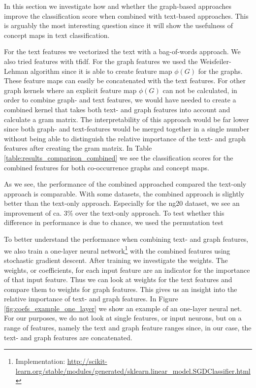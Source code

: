 
In this section we investigate how and whether the graph-based approaches improve the classification score when combined with text-based approaches.
This is arguably the most interesting question since it will show the usefulness of concept maps in text classification.

For the text features we vectorized the text with a bag-of-words approach. We also tried features with tfidf.
For the graph features we used the Weisfeiler-Lehman algorithm since it is able to create feature map $\phi(G)$ for the graphs.
These feature maps can easily be concatenated with the text features.
For other graph kernels where an explicit feature map $\phi(G)$ can not be calculated, in order to combine graph- and text features, we would have needed to create a combined kernel that takes both text- and graph features into account and calculate a gram matrix.
The interpretability of this approach would be far lower since both graph- and text-features would be merged together in a single number without being able to distinguish the relative importance of the text- and graph features after creating the gram matrix.
In Table \ref{table:results_comparison_combined} we see the classification scores for the combined features for both co-occurrence graphs and concept maps.

As we see, the performance of the combined approached compared the text-only approach is comparable.
With some datasets, the combined approach is slightly better than the text-only approach. Especially for the ng20 dataset, we see an improvement of ca. 3\% over the text-only approach.
To test whether this difference in performance is due to chance, we used the permutation test

To better understand the performance when combining text- and graph features, we also train a one-layer neural network\footnote{Implementation: \url{http://scikit-learn.org/stable/modules/generated/sklearn.linear_model.SGDClassifier.html}} with the combined features using stochastic gradient descent. After training we investigate the weights.
The weights, or coefficients, for each input feature are an indicator for the importance of that input feature.
Thus we can look at weights for the text features and compare them to weights for graph features.
This gives us an insight into the relative importance of text- and graph features.
In Figure \ref{fig:coefs_example_one_layer} we show an example of an one-layer neural net.
For our purposes, we do not look at single features, or input neurons, but on a range of features, namely the text and graph feature ranges since, in our case, the text- and graph features are concatenated.

